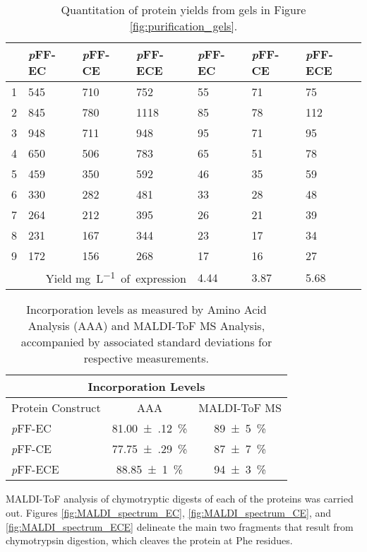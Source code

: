 \begin{refsection}
\begin{table}[h!]
\begin{tabular}{ lllllll }
  \hline
  &
  \emph{p}FF-EC &
  \emph{p}FF-CE &
  \emph{p}FF-ECE &
  \emph{p}FF-EC &
  \emph{p}FF-CE &
  \emph{p}FF-ECE \\ 
  \hline
  1 & 545 & 710 & 752 & 55 & 71 & 75 \\
  2 & 845 & 780 & 1118 & 85 & 78 & 112 \\
  3 & 948 & 711 & 948 & 95 & 71 & 95 \\
  4 & 650 & 506 & 783 & 65 & 51 & 78 \\
  5 & 459 & 350 & 592 & 46 & 35 & 59 \\
  6 & 330 & 282 & 481 & 33 & 28 & 48 \\
  7 & 264 & 212 & 395 & 26 & 21 & 39 \\
  8 & 231 & 167 & 344 & 23 & 17 & 34 \\
  9 & 172 & 156 & 268 & 17 & 16 & 27 \\
  \hline
  \multicolumn{4}{r}{Yield \si{\mg \per \L of expression}} & 4.44 & 3.87 & 5.68
\end{tabular}
\caption{Quantitation of protein yields from gels in Figure
    \ref{fig:purification_gels}.}
\label{tab:yield_analysis}
\end{table}
\begin{table}[h!]
    \centering
\begin{tabular}{lcc}
  \hline
  \multicolumn{3}{c}{Incorporation Levels} \\
  \hline
  Protein Construct & AAA & MALDI-ToF MS \\
  \hline
  \emph{p}FF-EC & \SI{81.00(12)}{\percent} & \SI{89(5)}{\percent} \\
  \emph{p}FF-CE & \SI{77.75(29)}{\percent} & \SI{87(7)}{\percent} \\
  \emph{p}FF-ECE & \SI{88.85(100)}{\percent} & \SI{94(3)}{\percent} \\
  \hline
\end{tabular}
\caption{Incorporation levels as measured by Amino Acid Analysis (AAA) and
MALDI-ToF MS Analysis, accompanied by associated standard deviations for
respective measurements.}
\label{tab:incorporation_numbers}
\end{table}
MALDI-ToF analysis of chymotryptic digests of each of the proteins was carried
out. Figures \ref{fig:MALDI_spectrum_EC}, \ref{fig:MALDI_spectrum_CE}, and
\ref{fig:MALDI_spectrum_ECE} delineate the main two fragments that result from
chymotrypsin digestion, which cleaves the protein at Phe residues.

\end{refsection}
